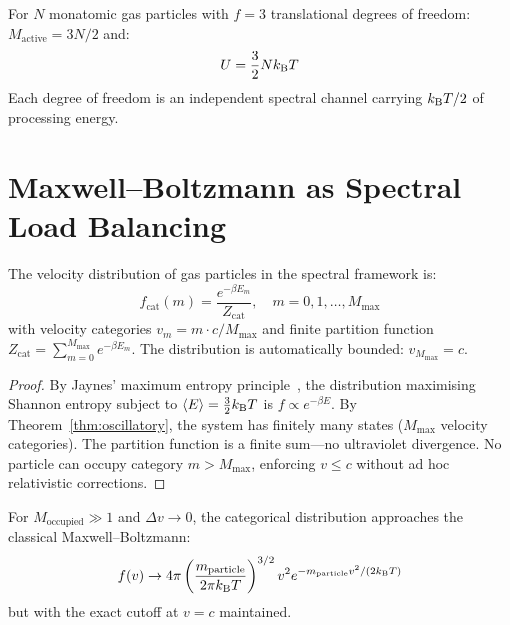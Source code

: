\begin{corollary}[Equipartition]
For $N$ monatomic gas particles with $f = 3$ translational degrees of freedom: $M_{\mathrm{active}} = 3N/2$ and:
\begin{equation}
    U = \frac{3}{2}Nk_{\mathrm{B}} T
\end{equation}
Each degree of freedom is an independent spectral channel carrying $k_{\mathrm{B}} T/2$ of processing energy.
\end{corollary}

\section{Maxwell--Boltzmann as Spectral Load Balancing}
\label{sec:maxwell_boltzmann}

\begin{theorem}
\label{thm:maxwell}
The velocity distribution of gas particles in the spectral framework is:
\begin{equation}
    f_{\mathrm{cat}}(m) = \frac{e^{-\beta E_m}}{Z_{\mathrm{cat}}}, \quad m = 0, 1, \ldots, M_{\max}
\end{equation}
with velocity categories $v_m = m \cdot c/M_{\max}$ and finite partition function $Z_{\mathrm{cat}} = \sum_{m=0}^{M_{\max}} e^{-\beta E_m}$. The distribution is automatically bounded: $v_{M_{\max}} = c$.
\end{theorem}

\begin{proof}
By Jaynes' maximum entropy principle~\cite{jaynes1957}, the distribution maximising Shannon entropy subject to $\langle E \rangle = \tfrac{3}{2}k_{\mathrm{B}} T$ is $f \propto e^{-\beta E}$. By Theorem~\ref{thm:oscillatory}, the system has finitely many states ($M_{\max}$ velocity categories). The partition function is a finite sum---no ultraviolet divergence. No particle can occupy category $m > M_{\max}$, enforcing $v \leq c$ without ad hoc relativistic corrections.
\end{proof}

\begin{proposition}
For $M_{\mathrm{occupied}} \gg 1$ and $\Delta v \to 0$, the categorical distribution approaches the classical Maxwell--Boltzmann:
\begin{equation}
    f(v) \to 4\pi \left(\frac{m_{\mathrm{particle}}}{2\pi k_{\mathrm{B}} T}\right)^{3/2} v^2 e^{-m_{\mathrm{particle}} v^2/(2k_{\mathrm{B}} T)}
\end{equation}
but with the exact cutoff at $v = c$ maintained.
\end{proposition}

